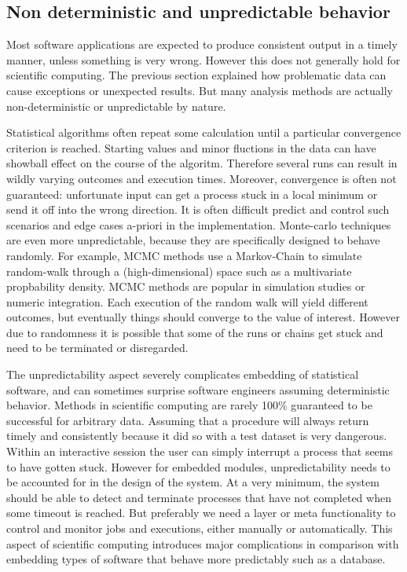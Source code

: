 \subsection{Non deterministic and unpredictable behavior}

Most software applications are expected to produce consistent output in a timely manner, unless something is very wrong. However this does not generally hold for scientific computing. The previous section explained how problematic data can cause exceptions or unexpected results. But many analysis methods are actually non-deterministic or unpredictable by nature.

Statistical algorithms often repeat some calculation until a particular convergence criterion is reached. Starting values and minor fluctions in the data can have showball effect on the course of the algoritm. Therefore several runs can result in wildly varying outcomes and execution times. Moreover, convergence is often not guaranteed: unfortunate input can get a process stuck in a local minimum or send it off into the wrong direction. It is often difficult predict and control such scenarios and edge cases a-priori in the implementation. Monte-carlo techniques are even more unpredictable, because they are specifically designed to behave randomly. For example, MCMC methods use a Markov-Chain to simulate random-walk through a (high-dimensional) space such as a multivariate propbability density. MCMC methods are popular in simulation studies or numeric integration. Each execution of the random walk will yield different outcomes, but eventually things should converge to the value of interest. However due to randomness it is possible that some of the runs or chains get stuck and need to be terminated or disregarded.

The unpredictability aspect severely complicates embedding of statistical software, and can sometimes surprise software engineers assuming deterministic behavior. Methods in scientific computing are rarely 100\% guaranteed to be successful for arbitrary data. Assuming that a procedure will always return timely and consistently because it did so with a test dataset is very dangerous. Within an interactive session the user can simply interrupt a process that seems to have gotten stuck. However for embedded modules, unpredictability needs to be accounted for in the design of the system. At a very minimum, the system should be able to detect and terminate processes that have not completed when some timeout is reached. But preferably we need a layer or meta functionality to control and monitor jobs and executions, either manually or automatically.  This aspect of scientific computing introduces major complications in comparison with embedding types of software that behave more predictably such as a database. 

